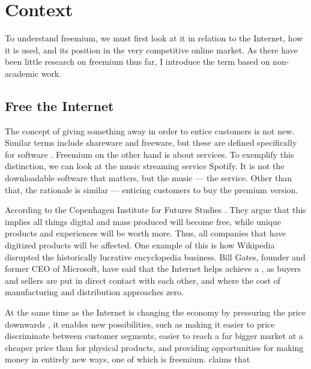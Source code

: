 \chapter{Context}
\label{chapter:context}

To understand freemium, we must first look at it in relation to the Internet, how it is used, and its position in the very competitive online market. As there have been little research on freemium thus far, I introduce the term based on non-academic work.

\section{Free \oldand the Internet}

The concept of giving something away in order to entice customers is not new. Similar terms include shareware and freeware, but these are defined specifically for software \citep[\eg][]{liao2002}. Freemium on the other hand is about services. To exemplify this distinction, we can look at the music streaming service Spotify. It is not the downloadable software that matters, but the music --- the service. Other than that, the rationale is similar --- enticing customers to buy the premium version.

According to the Copenhagen Institute for Futures Studies  \citep[]{anarconomy2009}. They argue that this implies all things digital and mass produced will become free, while unique products and experiences will be worth more. Thus, all companies that have digitized products will be affected. One example of this is how Wikipedia disrupted the historically lucrative encyclopedia business. Bill Gates, founder and former CEO of Microsoft, have said that the Internet helps achieve a  \citep{gates1995,gates2006}, as buyers and sellers are put in direct contact with each other, and where the cost of manufacturing and distribution approaches zero.

At the same time as the Internet is changing the economy by pressuring the price downwards \citep{anderson2009}, it enables new possibilities, \eg such as making it easier to price discriminate between customer segments, easier to reach a far bigger market at a cheaper price than for physical products, and providing opportunities for making money in entirely new ways, one of which is freemium. \citet{anderson2009} claims that 


